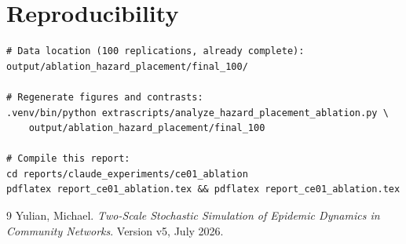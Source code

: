 \documentclass[11pt,a4paper]{article}
\begin{document}
\section{Reproducibility}

\begin{verbatim}
# Data location (100 replications, already complete):
output/ablation_hazard_placement/final_100/

# Regenerate figures and contrasts:
.venv/bin/python extrascripts/analyze_hazard_placement_ablation.py \
    output/ablation_hazard_placement/final_100

# Compile this report:
cd reports/claude_experiments/ce01_ablation
pdflatex report_ce01_ablation.tex && pdflatex report_ce01_ablation.tex
\end{verbatim}

\begin{thebibliography}{9}
  Yulian, Michael.
  \textit{Two-Scale Stochastic Simulation of Epidemic Dynamics in Community Networks}.
  Version v5, July 2026.
\end{thebibliography}
\end{document}
